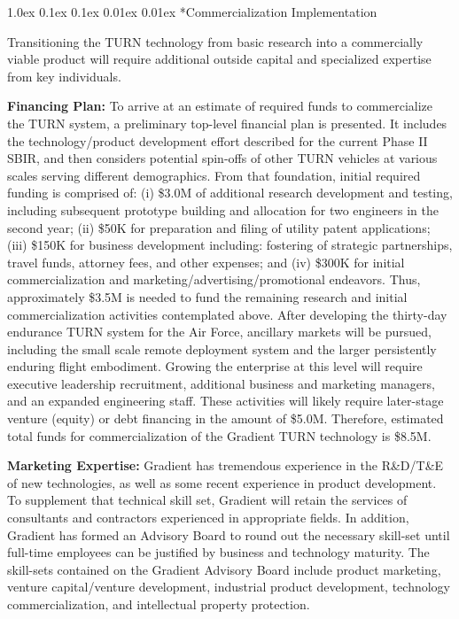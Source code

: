 \documentclass[11pt]{article}
\makeatletter
\renewcommand\subsection{
\@startsection{subsection}{2}{\z@}%
{1.0ex \@plus 0.1ex \@minus 0.1ex}%
{0.01ex \@plus 0.01ex}%
{\normalfont\Large\bfseries}}
\makeatother
\begin{document}
\subsection*{Commercialization Implementation}

Transitioning the TURN technology from basic research into a commercially viable product will require additional outside capital and specialized expertise from key individuals.


{\bf Financing Plan:}
To arrive at an estimate of required funds to commercialize the TURN system, a preliminary top-level financial plan is presented.  It includes the technology/product development effort described for the current Phase II SBIR, and then considers potential spin-offs of other TURN vehicles at various scales serving different demographics.  From that foundation, initial required funding is comprised of: (i) \$3.0M of additional research development and testing, including subsequent prototype building and allocation for two engineers in the second year; (ii) \$50K for preparation and filing of utility patent applications; (iii) \$150K for business development including: fostering of strategic partnerships, travel funds, attorney fees, and other expenses; and (iv) \$300K for initial commercialization and marketing/advertising/promotional endeavors.  Thus, approximately \$3.5M is needed to fund the remaining research and initial commercialization activities contemplated above.  After developing the thirty-day endurance TURN system for the Air Force, ancillary markets will be pursued, including the small scale remote deployment system and the larger persistently enduring flight embodiment.  Growing the enterprise at this level will require executive leadership recruitment, additional business and marketing managers, and an expanded engineering staff.  These activities will likely require later-stage venture (equity) or debt financing in the amount of \$5.0M.  Therefore, estimated total funds for commercialization of the Gradient TURN technology is \$8.5M.


{\bf Marketing Expertise:}
Gradient has tremendous experience in the R\&D/T\&E of new technologies, as well as some recent experience in product development.  To supplement that technical skill set, Gradient will retain the services of consultants and contractors experienced in appropriate fields.  In addition, Gradient has formed an Advisory Board to round out the necessary skill-set until full-time employees can be justified by business and technology maturity.  The skill-sets contained on the Gradient Advisory Board include product marketing, venture capital/venture development, industrial product development, technology commercialization, and intellectual property protection.
\end{document}
